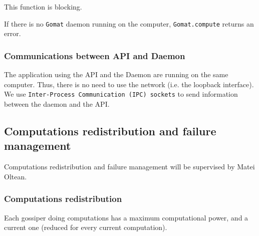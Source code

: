 \documentclass[a4paper,12pt]{article}
\newcommand{\Gomat}{\texttt{Gomat}\xspace}
\begin{document}
    This function is blocking.

    If there is no \Gomat daemon running on the computer, \texttt{Gomat.compute} returns an error.

        \subsubsection{Communications between API and Daemon}
    The application using the API and the Daemon are running on the same computer. Thus, there is no need to use the network (i.e. the loopback interface).
    We use \texttt{Inter-Process Communication (IPC) sockets} to send information between the daemon and the API.

        \subsection{Computations redistribution and failure management}
        Computations redistribution and failure management will be supervised by Matei Oltean.

        \subsubsection{Computations redistribution}
    Each gossiper doing computations has a maximum computational power, and a current one (reduced for every current computation).
    
\end{document}

